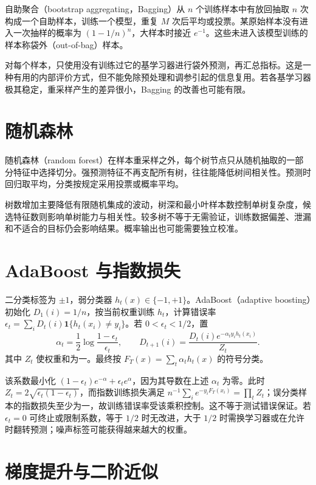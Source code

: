 \documentclass[UTF8,12pt,a4paper,fontset=fandol]{ctexbook}
\begin{document}
自助聚合（bootstrap aggregating，Bagging）从 $n$ 个训练样本中有放回抽取 $n$ 次构成一个自助样本，训练一个模型，重复 $M$ 次后平均或投票。某原始样本没有进入一次抽样的概率为 $(1-1/n)^n$，大样本时接近 $e^{-1}$。这些未进入该模型训练的样本称袋外（out-of-bag）样本。

对每个样本，只使用没有训练过它的基学习器进行袋外预测，再汇总指标。这是一种有用的内部评价方式，但不能免除预处理和调参引起的信息复用。若各基学习器极其稳定，重采样产生的差异很小，Bagging 的改善也可能有限。

\section{随机森林}

随机森林（random forest）在样本重采样之外，每个树节点只从随机抽取的一部分特征中选择切分。强预测特征不再支配所有树，往往能降低树间相关性。预测时回归取平均，分类按规定采用投票或概率平均。

树数增加主要降低有限随机集成的波动，树深和最小叶样本数控制单树复杂度，候选特征数则影响单树能力与相关性。较多树不等于无需验证，训练数据偏差、泄漏和不适合的目标仍会影响结果。概率输出也可能需要独立校准。

\section{AdaBoost 与指数损失}

二分类标签为 $\pm1$，弱分类器 $h_t(x)\in\{-1,+1\}$。AdaBoost（adaptive boosting）初始化 $D_1(i)=1/n$，按当前权重训练 $h_t$，计算错误率 $\epsilon_t=\sum_iD_t(i)\mathbf1\{h_t(x_i)\ne y_i\}$。若 $0<\epsilon_t<1/2$，置
\begin{equation}
 \alpha_t=\frac12\log\frac{1-\epsilon_t}{\epsilon_t},\qquad
 D_{t+1}(i)=\frac{D_t(i)e^{-\alpha_ty_ih_t(x_i)}}{Z_t}.
 \label{eq:ml-adaboost-update}
\end{equation}
其中 $Z_t$ 使权重和为一。最终按 $F_T(x)=\sum_t\alpha_th_t(x)$ 的符号分类。

该系数最小化 $(1-\epsilon_t)e^{-\alpha}+\epsilon_te^\alpha$，因为其导数在上述 $\alpha_t$ 为零。此时 $Z_t=2\sqrt{\epsilon_t(1-\epsilon_t)}$，而指数训练损失满足 $n^{-1}\sum_i e^{-y_iF_T(x_i)}=\prod_tZ_t$；误分类样本的指数损失至少为一，故训练错误率受该乘积控制。这不等于测试错误保证。若 $\epsilon_t=0$ 可终止或限制系数，等于 $1/2$ 时无改进，大于 $1/2$ 时需换学习器或在允许时翻转预测；噪声标签可能获得越来越大的权重。

\section{梯度提升与二阶近似}
\end{document}
